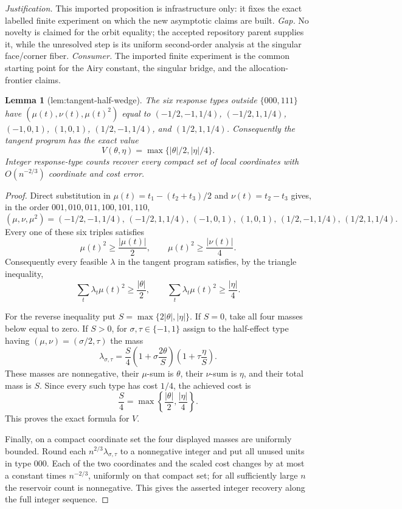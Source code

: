 \documentclass{article}
\newtheorem{lemma}{Lemma}
\begin{document}
\par\smallskip\noindent \textit{Justification.} This imported proposition is infrastructure only: it fixes the exact labelled finite experiment on which the new asymptotic claims are built. \textit{Gap.} No novelty is claimed for the orbit equality; the accepted repository parent supplies it, while the unresolved step is its uniform second-order analysis at the singular face/corner fiber. \textit{Consumer.} The imported finite experiment is the common starting point for the Airy constant, the singular bridge, and the allocation-frontier claims.

\begin{lemma}[lem:tangent-half-wedge]\label{lem:tangent-half-wedge}
The six response types outside \(\{000,111\}\) have \((\mu(t),\nu(t),\mu(t)^2)\) equal to \((-1/2,-1,1/4)\), \((-1/2,1,1/4)\), \((-1,0,1)\), \((1,0,1)\), \((1/2,-1,1/4)\), and \((1/2,1,1/4)\). Consequently the tangent program has the exact value \[V(\theta,\eta)=\max\{|\theta|/2,|\eta|/4\}.\] Integer response-type counts recover every compact set of local coordinates with \(O(n^{-2/3})\) coordinate and cost error.
\end{lemma}
\begin{proof}
Direct substitution in \(\mu(t)=t_1-(t_2+t_3)/2\) and \(\nu(t)=t_2-t_3\) gives, in the order \(001,010,011,100,101,110\),
\[
(\mu,\nu,\mu^2)
=(-1/2,-1,1/4),\,(-1/2,1,1/4),\,(-1,0,1),\,
  (1,0,1),\,(1/2,-1,1/4),\,(1/2,1,1/4).
\]
Every one of these six triples satisfies
\[
 \mu(t)^2\geq \frac{|\mu(t)|}{2},
 \qquad
 \mu(t)^2\geq \frac{|\nu(t)|}{4}.
\]
Consequently every feasible \(\lambda\) in the tangent program satisfies, by the triangle inequality,
\[
\sum_t\lambda_t\mu(t)^2\geq\frac{|\theta|}{2},
\qquad
\sum_t\lambda_t\mu(t)^2\geq\frac{|\eta|}{4}.
\]

For the reverse inequality put \(S=\max\{2|\theta|,|\eta|\}\).  If \(S=0\), take all four masses below equal to zero.  If \(S>0\), for \(\sigma,\tau\in\{-1,1\}\) assign to the half-effect type having \((\mu,\nu)=(\sigma/2,\tau)\) the mass
\[
 \lambda_{\sigma,\tau}
 =\frac S4\left(1+\sigma\frac{2\theta}{S}\right)
             \left(1+\tau\frac{\eta}{S}\right).
\]
These masses are nonnegative, their \(\mu\)-sum is \(\theta\), their \(\nu\)-sum is \(\eta\), and their total mass is \(S\).  Since every such type has cost \(1/4\), the achieved cost is
\[
 \frac S4=\max\left\{\frac{|\theta|}{2},\frac{|\eta|}{4}\right\}.
\]
This proves the exact formula for \(V\).

Finally, on a compact coordinate set the four displayed masses are uniformly bounded.  Round each \(n^{2/3}\lambda_{\sigma,\tau}\) to a nonnegative integer and put all unused units in type \(000\).  Each of the two coordinates and the scaled cost changes by at most a constant times \(n^{-2/3}\), uniformly on that compact set; for all sufficiently large \(n\) the reservoir count is nonnegative.  This gives the asserted integer recovery along the full integer sequence.
\end{proof}
\end{document}
